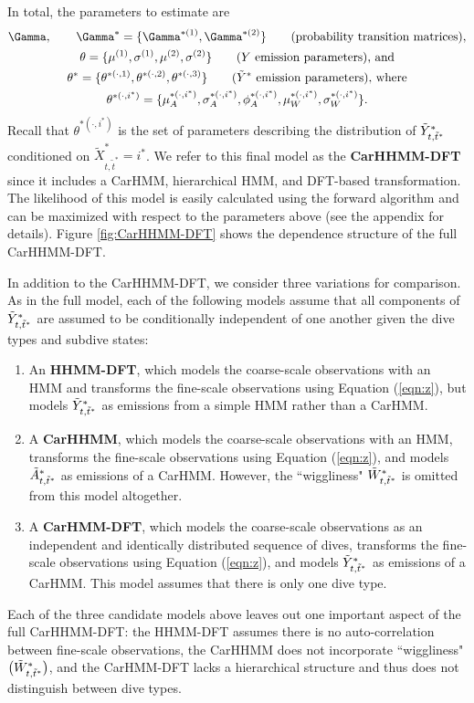 In total, the parameters to estimate are
%
\begin{gather*}
    \Gamma, \qquad \Gamma^{*} = \{\Gamma^{*(1)},\Gamma^{*(2)}\} \qquad \text{(probability transition matrices)}, \\
    \theta = \{\mu^{(1)},\sigma^{(1)},\mu^{(2)},\sigma^{(2)}\} \qquad \text{($Y$ emission parameters), and} \\
    \theta^* = \{\theta^{*(\cdot,1)},\theta^{*(\cdot,2)},\theta^{*(\cdot,3)}\}  \qquad \text{($\Z$ emission parameters), where} \\
    \theta^{*(\cdot,i^*)} =  \{\mu_A^{*(\cdot,i^*)},\sigma_A^{*(\cdot,i^*)},\phi_A^{*(\cdot,i^*)},\mu_W^{*(\cdot,i^*)},\sigma_W^{*(\cdot,i^*)}\}.
\end{gather*}
%
Recall that $\theta^{*(\cdot,i^*)}$ is the set of parameters describing the distribution of $\tilde{Y}^*_{t,\tilde t^*}$ conditioned on $\tilde X^*_{t,\tilde t^*} = i^*$. 
%
We refer to this final model as the \textbf{CarHHMM-DFT} since it includes a CarHMM, hierarchical HMM, and DFT-based transformation. The likelihood of this model is easily calculated using the forward algorithm and can be maximized with respect to the parameters above (see the appendix for details). Figure \ref{fig:CarHHMM-DFT} shows the dependence structure of the full CarHHMM-DFT.

In addition to the CarHHMM-DFT, we consider three variations for comparison. As in the full model, each of the following models assume that all components of $\tilde{Y}^*_{t,\tilde t^*}$ are assumed to be conditionally independent of one another given the dive types and subdive states:
\begin{enumerate}
    \item An \textbf{HHMM-DFT}, which models the coarse-scale observations with an HMM and transforms the fine-scale observations using Equation (\ref{eqn:z}), but models $\tilde{Y}^*_{t,\tilde t^*}$ as emissions from a simple HMM rather than a CarHMM.
    \item A \textbf{CarHHMM}, which models the coarse-scale observations with an HMM, transforms the fine-scale observations using Equation (\ref{eqn:z}), and models $\tilde{A}^*_{t,\tilde t^*}$ as emissions of a CarHMM. However, the ``wiggliness"  $\tilde{W}^*_{t,\tilde t^*}$ is omitted from this model altogether.
    \item A \textbf{CarHMM-DFT}, which models the coarse-scale observations as an independent and identically distributed sequence of dives, transforms the fine-scale observations using Equation (\ref{eqn:z}), and models $\tilde{Y}^*_{t,\tilde t^*}$ as emissions of a CarHMM. This model assumes that there is only one dive type.
\end{enumerate}
%
Each of the three candidate models above leaves out one important aspect of the full CarHHMM-DFT: the HHMM-DFT assumes there is no auto-correlation between fine-scale observations, the CarHHMM does not incorporate ``wiggliness" $\big(\tilde{W}^*_{t,\tilde t^*}\big)$, and the CarHMM-DFT lacks a hierarchical structure and thus does not distinguish between dive types.

